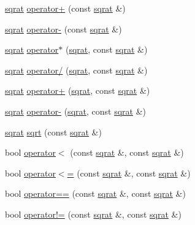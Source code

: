 \begin{DoxyCompactItemize}
\item 
\mbox{\hyperlink{classsqrat}{sqrat}} \mbox{\hyperlink{classsqrat_a5a4ae2683cd1f23c81c09229d1dcc34a}{operator+}} (const \mbox{\hyperlink{classsqrat}{sqrat}} \&)
\item 
\mbox{\hyperlink{classsqrat}{sqrat}} \mbox{\hyperlink{classsqrat_ade89f3d4e5e8de405db9e23a1420d332}{operator-\/}} (const \mbox{\hyperlink{classsqrat}{sqrat}} \&)
\item 
\mbox{\hyperlink{classsqrat}{sqrat}} \mbox{\hyperlink{classsqrat_a0f75e7f8b43c76214b0845eadbfbfe6b}{operator$\ast$}} (\mbox{\hyperlink{classsqrat}{sqrat}}, const \mbox{\hyperlink{classsqrat}{sqrat}} \&)
\item 
\mbox{\hyperlink{classsqrat}{sqrat}} \mbox{\hyperlink{classsqrat_aa6e76248a9ec776743e60e5db8b3cb6d}{operator/}} (\mbox{\hyperlink{classsqrat}{sqrat}}, const \mbox{\hyperlink{classsqrat}{sqrat}} \&)
\item 
\mbox{\hyperlink{classsqrat}{sqrat}} \mbox{\hyperlink{classsqrat_a714592d215fdb454264df3d7bfbe0b5e}{operator+}} (\mbox{\hyperlink{classsqrat}{sqrat}}, const \mbox{\hyperlink{classsqrat}{sqrat}} \&)
\item 
\mbox{\hyperlink{classsqrat}{sqrat}} \mbox{\hyperlink{classsqrat_a78bb0ea9bd5a4282ba33a61c4bc073b6}{operator-\/}} (\mbox{\hyperlink{classsqrat}{sqrat}}, const \mbox{\hyperlink{classsqrat}{sqrat}} \&)
\item 
\mbox{\hyperlink{classsqrat}{sqrat}} \mbox{\hyperlink{classsqrat_aac93909598aa6f1b1b6bbe035a1af815}{sqrt}} (const \mbox{\hyperlink{classsqrat}{sqrat}} \&)
\item 
bool \mbox{\hyperlink{classsqrat_a1326bc7564a14f2fa4cbe59cdcf94b69}{operator$<$}} (const \mbox{\hyperlink{classsqrat}{sqrat}} \&, const \mbox{\hyperlink{classsqrat}{sqrat}} \&)
\item 
bool \mbox{\hyperlink{classsqrat_ae33aee8490a3137fb967fbd52b100f6d}{operator$<$=}} (const \mbox{\hyperlink{classsqrat}{sqrat}} \&, const \mbox{\hyperlink{classsqrat}{sqrat}} \&)
\item 
bool \mbox{\hyperlink{classsqrat_aa31a4a7298644b244db89e455265c946}{operator==}} (const \mbox{\hyperlink{classsqrat}{sqrat}} \&, const \mbox{\hyperlink{classsqrat}{sqrat}} \&)
\item 
bool \mbox{\hyperlink{classsqrat_ae100dba56606c0cfbbe45c04ae9f462a}{operator!=}} (const \mbox{\hyperlink{classsqrat}{sqrat}} \&, const \mbox{\hyperlink{classsqrat}{sqrat}} \&)
\item 

\end{DoxyCompactItemize}
